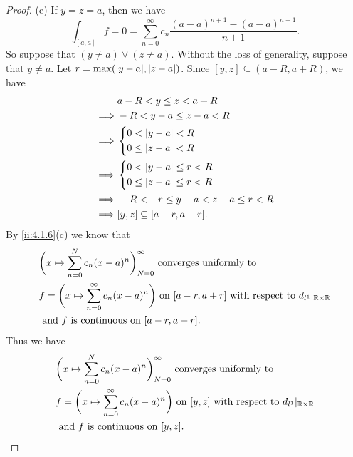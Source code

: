\begin{proof}{(e)}
  If \(y = z = a\), then we have
  \[
    \int_{[a, a]} f = 0 = \sum_{n = 0}^\infty c_n \dfrac{(a - a)^{n + 1} - (a - a)^{n + 1}}{n + 1}.
  \]
  So suppose that \((y \neq a) \lor (z \neq a)\).
  Without the loss of generality, suppose that \(y \neq a\).
  Let \(r = \max(\abs{y - a}, \abs{z - a})\).
  Since \([y, z] \subseteq (a - R, a + R)\), we have
  \begin{align*}
             & a - R < y \leq z < a + R              \\
    \implies & -R < y - a \leq z - a < R             \\
    \implies & \begin{dcases}
                 0 < \left\lvert y - a\right\rvert < R \\
                 0 \leq \left\lvert z - a\right\rvert < R
               \end{dcases}                 \\
    \implies & \begin{dcases}
                 0 < \left\lvert y - a\right\rvert \leq r < R \\
                 0 \leq \left\lvert z - a\right\rvert \leq r < R
               \end{dcases}          \\
    \implies & -R < -r \leq y - a < z - a \leq r < R \\
    \implies & [y, z] \subseteq [a - r, a + r].
  \end{align*}
  By \cref{ii:4.1.6}(c) we know that
  \begin{align*}
     & \bigg(x \mapsto \sum_{n = 0}^N c_n (x - a)^n\bigg)_{N = 0}^\infty \text{ converges uniformly to }                                       \\
     & f = \bigg(x \mapsto \sum_{n = 0}^\infty c_n (x - a)^n\bigg) \text{ on } [a - r, a + r] \text{ with respect to } d_{l^1}|_{\mathbb{R} \times \mathbb{R}} \\
     & \text{ and } f \text{ is continuous on } [a - r, a + r].
  \end{align*}
  Thus we have
  \begin{align*}
     & \bigg(x \mapsto \sum_{n = 0}^N c_n (x - a)^n\bigg)_{N = 0}^\infty \text{ converges uniformly to }                               \\
     & f = \bigg(x \mapsto \sum_{n = 0}^\infty c_n (x - a)^n\bigg) \text{ on } [y, z] \text{ with respect to } d_{l^1}|_{\mathbb{R} \times \mathbb{R}} \\
     & \text{ and } f \text{ is continuous on } [y, z].
  \end{align*}

\end{proof}
